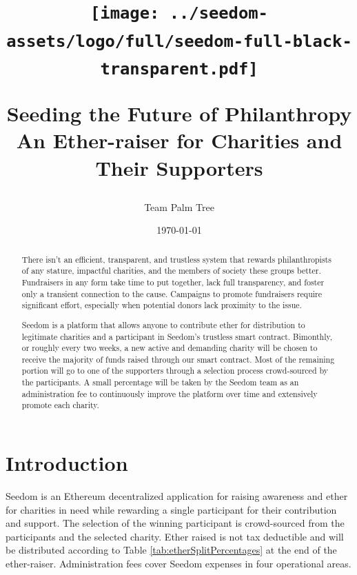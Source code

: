 \documentclass[11pt]{article}
\begin{document}
\title{%
\begin{center}
\texttt{[image: ../seedom-assets/logo/full/seedom-full-black-transparent.pdf]}
\end{center}
\large Seeding the Future of Philanthropy \\[1mm]
\large An Ether-raiser for Charities and Their Supporters \\[1mm]}
\author{Team Palm Tree}
\date{\today}
\maketitle

\begin{abstract}

There isn't an efficient, transparent, and trustless system that rewards philanthropists of any stature, impactful charities, and the members of society these groups better. Fundraisers in any form take time to put together, lack full transparency, and foster only a transient connection to the cause. Campaigns to promote fundraisers require significant effort, especially when potential donors lack proximity to the issue.

Seedom is a platform that allows anyone to contribute ether for distribution to legitimate charities and a participant in Seedom's trustless smart contract. Bimonthly, or roughly every two weeks, a new active and demanding charity will be chosen to receive the majority of funds raised through our smart contract. Most of the remaining portion will go to one of the supporters through a selection process crowd-sourced by the participants. A small percentage will be taken by the Seedom team as an administration fee to continuously improve the platform over time and extensively promote each charity.

\end{abstract}
\pagebreak

\tableofcontents
\pagebreak

\section{Introduction}

Seedom is an Ethereum decentralized application for raising awareness and ether for charities in need while rewarding a single participant for their contribution and support. The selection of the winning participant is crowd-sourced from the participants and the selected charity. Ether raised is not tax deductible and will be distributed according to Table \ref{tab:etherSplitPercentages} at the end of the ether-raiser. Administration fees cover Seedom expenses in four operational areas.
\end{document}
